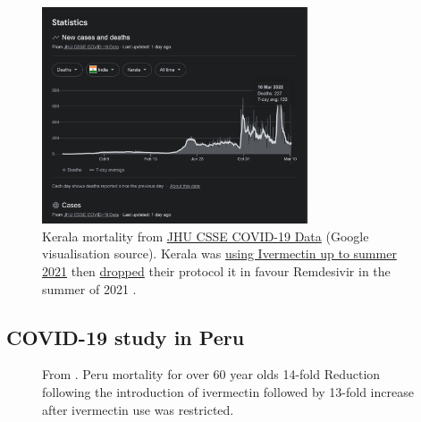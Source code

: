 \documentclass[11pt,a4paper,notitlepage]{report}
\begin{document}
\begin{figure}[h]
    \centering
    \includegraphics[width=0.7\textwidth]{india-kerala-mortality}
    \caption{Kerala mortality from \href{https://github.com/CSSEGISandData/COVID-19}{JHU CSSE COVID-19 Data} (Google visualisation source). Kerala was \href{https://dhs.kerala.gov.in/wp-content/uploads/2021/04/Kerala-State-COVID-19-guidelines-Version-3.pdf}{using Ivermectin up to summer 2021} then \href{https://www.thehindu.com/news/national/kerala/kerala-revises-covid-19-treatment-guidelines/article35775373.ece}{dropped} their protocol it in favour Remdesivir in the summer of 2021 \cite{hindu06082021}.}
    \label{fig:india-kerala-mortality}
\end{figure}

\clearpage

\subsection*{COVID-19 study in Peru}

\begin{figure}[h]
    \centering
    \caption{From \citet{Chamie2021}. Peru mortality for over 60 year olds 14-fold Reduction following the introduction of ivermectin followed by 13-fold increase after ivermectin use was restricted.}
    \label{fig:peru-mortality}
\end{figure}
\end{document}
